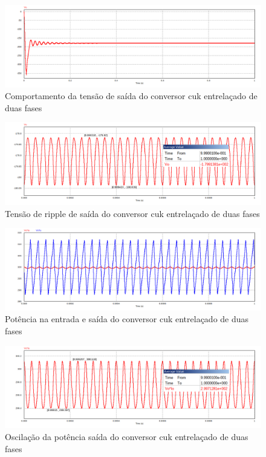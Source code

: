 \documentclass[
	12pt,				%
	openany,
	onseside,
	a4paper,			%
	english,			%
	french,				%
	spanish,			%
	brazil,				%
	]{abntex2}
\begin{document}
\begin{figure}[H]%
	\captionsetup{justification=centering}
	\centering
		\includegraphics[width= \linewidth]{cuk_inter_V_out}
		\caption{Comportamento da tensão de saída do conversor cuk entrelaçado de duas fases}
		\label{fig:cuk_inter_ripp_V_out}
\end{figure}

\begin{figure}[H]%
	\captionsetup{justification=centering}
	\centering
		\includegraphics[width= \linewidth]{cuk_inter_ripp_V_out}
		\caption{Tensão de ripple de saída do conversor cuk entrelaçado de duas fases}
		\label{fig:cuk_inter_ripp_V_out}
\end{figure}

\begin{figure}[H]%
	\captionsetup{justification=centering}
	\centering
		\includegraphics[width= \linewidth]{cuk_inter_power_sign}
		\caption{Potência na entrada e saída do conversor cuk entrelaçado de duas fases}
		\label{fig:cuk_inter_power_sign}
\end{figure}

\begin{figure}[H]%
	\captionsetup{justification=centering}
	\centering
		\includegraphics[width= \linewidth]{cuk_inter_pow_out}
		\caption{Oscilação da potência saída do conversor cuk entrelaçado de duas fases}
		\label{fig:cuk_inter_power_sign_out}
\end{figure}
\end{document}
